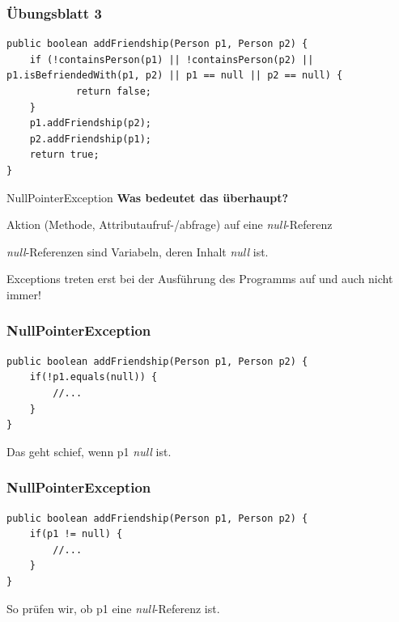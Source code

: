 \documentclass[18pt]{beamer}
\begin{document}

\begin{frame}[containsverbatim]
	\frametitle{Übungsblatt 3}
	\begin{lstlisting}
public boolean addFriendship(Person p1, Person p2) {
	if (!containsPerson(p1) || !containsPerson(p2) || p1.isBefriendedWith(p1, p2) || p1 == null || p2 == null) {
			return false;
	}
	p1.addFriendship(p2);
	p2.addFriendship(p1);
	return true;
}
	\end{lstlisting}
\end{frame}


\begin{frame}{NullPointerException}
	\textbf{Was bedeutet das überhaupt?}\pause
	
	Aktion (Methode, Attributaufruf-/abfrage) auf eine \emph{null}-Referenz\pause
	
	\emph{null}-Referenzen sind Variabeln, deren Inhalt \emph{null} ist.\pause
	
	Exceptions treten erst bei der Ausführung des Programms auf und auch nicht immer!
\end{frame}


\begin{frame}[containsverbatim]
	\frametitle{NullPointerException}
	\begin{lstlisting}
public boolean addFriendship(Person p1, Person p2) {
	if(!p1.equals(null)) {
		//...
	}
}
	\end{lstlisting}
	Das geht schief, wenn p1 \emph{null} ist.
\end{frame}


\begin{frame}[containsverbatim]
	\frametitle{NullPointerException}
	\begin{lstlisting}
public boolean addFriendship(Person p1, Person p2) {
	if(p1 != null) {
		//...
	}
}
	\end{lstlisting}
	So prüfen wir, ob p1 eine \emph{null}-Referenz ist.
\end{frame}

\end{document}
